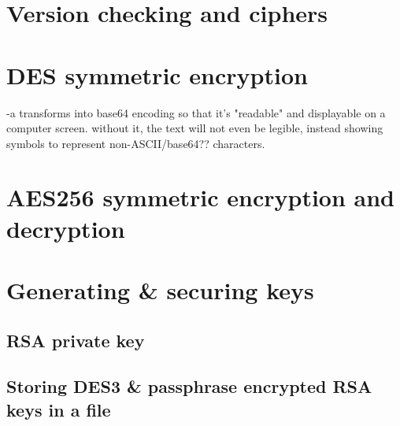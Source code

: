 \section{Version checking and ciphers}\label{sec:version}

\section{DES symmetric encryption}\label{sec:des}
-a transforms into base64 encoding so that it's "readable" and displayable on a computer screen.
without it, the text will not even be legible, instead showing symbols to represent
non-ASCII/base64?? characters.

\section{AES256 symmetric encryption and decryption}\label{sec:aes256}

\section{Generating \& securing keys}\label{sec:generating-&-securing-keys}
\subsection{RSA private key}\label{subsec:rsa-private-key}

\subsection{Storing DES3 \& passphrase encrypted RSA keys in a file}\label{subsec:storing-keys-in-file}
